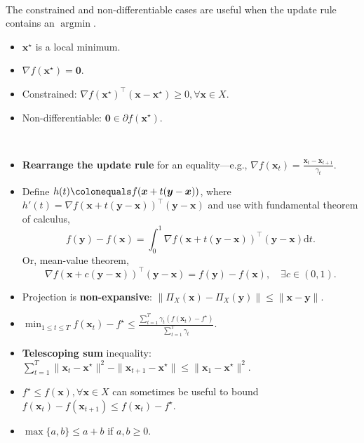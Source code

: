 \documentclass[8pt,a4paper]{extarticle}
\DeclareMathOperator*{\argmin}{argmin}
\renewcommand{\vec}[1]{\bm{#1}}
\newenvironment{topic}[1]
{\textbf{\sffamily \colorbox{black}{\rlap{\textbf{\textcolor{white}{#1}}}\hspace{\linewidth}\hspace{-2\fboxsep}}} \\ \vspace{0.2cm}}
{}
\begin{document}
\begin{multicols*}{2}
    \begin{topic}{Optimality lemmas (assume convexity)}
        The constrained and non-differentiable cases are useful when the update rule contains an $\argmin$.
        \begin{itemize}
            \item $\vec{x}^\star$ is a local minimum.
            \item $\nabla f(\vec{x}^\star) = \vec{0}$.
            \item Constrained: $\nabla f(\vec{x}^\star)^\top (\vec{x} - \vec{x}^\star) \geq 0, \forall \vec{x} \in
                      X$.
            \item Non-differentiable: $\vec{0} \in \partial f(\vec{x}^\star)$.
        \end{itemize}
    \end{topic}

    \begin{topic}{Common tricks}
        \begin{itemize}
            \item \textbf{Rearrange the update rule} for an equality---e.g., $\nabla f(\vec{x}_t) = \frac{\vec{x}_t -
                          \vec{x}_{t+1}}{\gamma_t}$.
            \item Define $h(t) \colonequals f(\vec{x} + t(\vec{y} - \vec{x}))$, where $h'(t) = \nabla f(\vec{x} +
                      t(\vec{y} - \vec{x}))^\top (\vec{y} - \vec{x})$ and use with fundamental theorem of calculus, \[
                      f(\vec{y}) - f(\vec{x}) = \int_0^1 \nabla f(\vec{x} + t(\vec{y} - \vec{x}))^\top (\vec{y} - \vec{x}) \mathrm{d}t.
                  \]
                  Or, mean-value theorem, \[
                      \nabla f(\vec{x} + c(\vec{y} - \vec{x}))^\top (\vec{y} - \vec{x}) = f(\vec{y}) - f(\vec{x}), \quad \exists c \in (0,1).
                  \]
            \item Projection is \textbf{non-expansive}: $\| \Pi_X(\vec{x}) - \Pi_X(\vec{y}) \| \leq \| \vec{x} -
                      \vec{y} \|$.
            \item $\min_{1 \leq t \leq T} f(\vec{x}_t) - f^\star \leq \frac{\sum_{t=1}^{T} \gamma_t (f(\vec{x}_t) - f^\star)}{\sum_{t=1}^{T} \gamma_t}$.
            \item \textbf{Telescoping sum} inequality:\\ $\sum_{t=1}^{T} \| \vec{x}_t - \vec{x}^\star \|^2 - \| \vec{x}_{t+1} -
                      \vec{x}^\star \| \leq \| \vec{x}_1 - \vec{x}^\star \|^2$.
            \item $f^\star \leq f(\vec{x}), \forall \vec{x} \in X$ can sometimes be useful to bound $f(\vec{x}_t) - f(\vec{x}_{t+1}) \leq f(\vec{x}_t) - f^\star$.
            \item $\max \{ a,b \} \leq a + b$ if $a,b \geq 0$.
        \end{itemize}
    \end{topic}


\end{multicols*}
\end{document}
